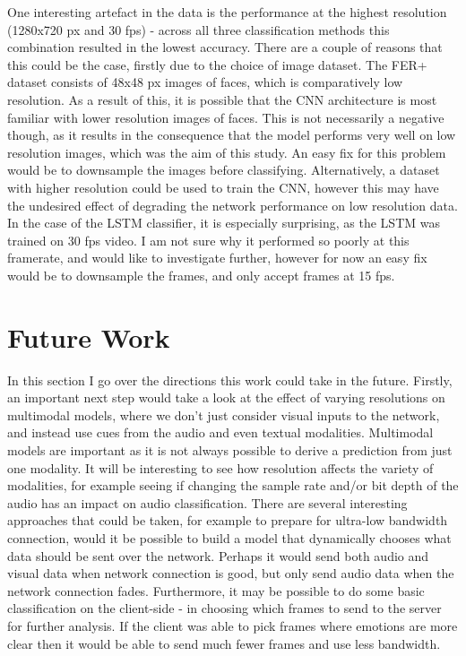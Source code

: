 \documentclass[sigconf]{acmart}
\begin{document}
{One interesting artefact in the data is the performance at the highest
resolution (1280x720 px and 30 fps) - across all three classification methods
this combination resulted in the lowest accuracy.
There are a couple of
reasons that this could be the case, firstly due to the choice of image
dataset. The FER+ dataset consists of 48x48 px images of faces, which is
comparatively low resolution. As a result of this, it is possible that
the CNN architecture is most familiar with lower resolution images of faces.
This is not necessarily a negative though, as it results in the consequence
that the model performs very well on low resolution images, which was the aim
of this study. 
An easy fix for this problem would be to downsample the images before
classifying. Alternatively, a dataset with higher resolution could be used to train the
CNN, however this may have the undesired effect of degrading the network
performance on low resolution data.
In the case of the LSTM classifier, it is especially surprising, as the LSTM
was trained on 30 fps video. I am not sure why it performed so poorly at this
framerate, and would like to investigate further, however for now an easy fix
would be to downsample the frames, and only accept frames at 15 fps.


\section{Future Work}

In this section I go over the directions this work could take in the future.
Firstly, an important next step would take a look at the effect of varying
resolutions on multimodal models, where
we don't just consider visual inputs to the network, and instead use cues from
the audio and even textual modalities. Multimodal models are important as it
is not always possible to derive a prediction from just one modality. 
It will be interesting to see how
resolution affects the variety of modalities, for example seeing if changing
the sample rate and/or bit depth of the audio has an impact on audio
classification. There are several interesting approaches that could be taken,
for example to prepare for ultra-low bandwidth connection, would it be
possible to build a model that dynamically chooses what data should be sent
over the network. Perhaps it would send both audio and visual data when
network connection is good, but only send audio data when the network
connection fades. Furthermore, it may be possible to do some basic
classification on the client-side - in choosing which frames to send to the
server for further analysis. If the client was able to pick frames where
emotions are more clear then it would be able to send much fewer frames and
use less bandwidth.

}
\end{document}

